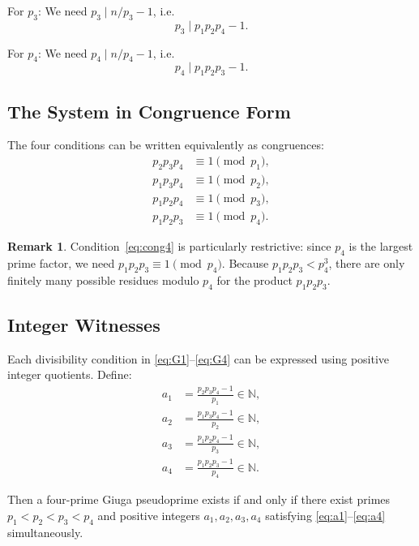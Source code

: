 \documentclass[12pt,a4paper]{amsart}
\theoremstyle{definition}
\newtheorem{remark}[theorem]{Remark}
\newcommand{\N}{\mathbb{N}}
\begin{document}
For $p_3$: We need $p_3 \mid n/p_3 - 1$, i.e.\
\begin{equation}
  p_3 \mid p_1 p_2 p_4 - 1.
  \tag{G3}
  \label{eq:G3}
\end{equation}

For $p_4$: We need $p_4 \mid n/p_4 - 1$, i.e.\
\begin{equation}
  p_4 \mid p_1 p_2 p_3 - 1.
  \tag{G4}
  \label{eq:G4}
\end{equation}

\subsection{The System in Congruence Form}

The four conditions can be written equivalently as congruences:
\begin{align}
  p_2 p_3 p_4 &\equiv 1 \pmod{p_1}, \label{eq:cong1} \\
  p_1 p_3 p_4 &\equiv 1 \pmod{p_2}, \label{eq:cong2} \\
  p_1 p_2 p_4 &\equiv 1 \pmod{p_3}, \label{eq:cong3} \\
  p_1 p_2 p_3 &\equiv 1 \pmod{p_4}. \label{eq:cong4}
\end{align}

\begin{remark}
Condition~\eqref{eq:cong4} is particularly restrictive: since $p_4$ is the
largest prime factor, we need $p_1 p_2 p_3 \equiv 1 \pmod{p_4}$.  Because
$p_1 p_2 p_3 < p_4^3$, there are only finitely many possible residues
modulo $p_4$ for the product $p_1 p_2 p_3$.
\end{remark}

\subsection{Integer Witnesses}

Each divisibility condition in \eqref{eq:G1}--\eqref{eq:G4} can be expressed
using positive integer quotients.  Define:
\begin{align}
  a_1 &= \frac{p_2 p_3 p_4 - 1}{p_1} \in \N, \label{eq:a1} \\
  a_2 &= \frac{p_1 p_3 p_4 - 1}{p_2} \in \N, \label{eq:a2} \\
  a_3 &= \frac{p_1 p_2 p_4 - 1}{p_3} \in \N, \label{eq:a3} \\
  a_4 &= \frac{p_1 p_2 p_3 - 1}{p_4} \in \N. \label{eq:a4}
\end{align}

Then a four-prime Giuga pseudoprime exists if and only if there exist primes
$p_1 < p_2 < p_3 < p_4$ and positive integers $a_1, a_2, a_3, a_4$ satisfying
\eqref{eq:a1}--\eqref{eq:a4} simultaneously.
\end{document}
